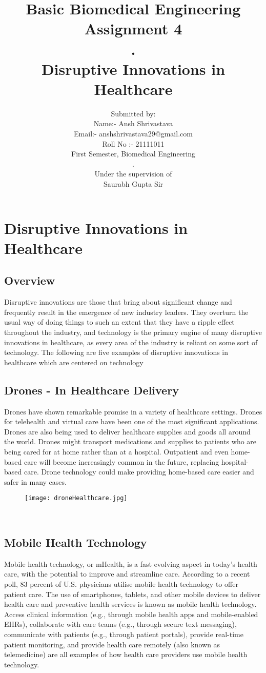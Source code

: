 \documentclass[12pt]{article}
\title{Basic Biomedical Engineering\\Assignment 4\\.\\Disruptive Innovations in Healthcare}
\author{Submitted by: \\Name:- Ansh Shrivastava\\Email:- anshshrivastava29@gmail.com\\Roll No :- 21111011\\First Semester, Biomedical Engineering\\.\\Under the supervision of\\Saurabh Gupta Sir}
\begin{document}
\maketitle
\clearpage
\tableofcontents
\clearpage

\section{Disruptive Innovations in Healthcare}
\subsection{Overview}
Disruptive innovations are those that bring about significant change and frequently result in the emergence of new industry leaders. They overturn the usual way of doing things to such an extent that they have a ripple effect throughout the industry,  and technology is the primary engine of many disruptive innovations in healthcare, as every area of the industry is reliant on some sort of technology. The following are five examples of disruptive innovations in healthcare which are centered on technology
\subsection{Drones - In Healthcare Delivery}
Drones have shown remarkable promise in a variety of healthcare settings. Drones for telehealth and virtual care have been one of the most significant applications. Drones are also being used to deliver healthcare supplies and goods all around the world. Drones might transport medications and supplies to patients who are being cared for at home rather than at a hospital. Outpatient and even home-based care will become increasingly common in the future, replacing hospital-based care. Drone technology could make providing home-based care easier and safer in many cases.
\\
\begin{figure}[h]
\centering
\texttt{[image: droneHealthcare.jpg]}
\label{fig_droneHealthcare}
\end{figure}
\\
\subsection{Mobile Health Technology}
Mobile health technology, or mHealth, is a fast evolving aspect in today's health care, with the potential to improve and streamline care. According to a recent poll, 83 percent of U.S. physicians utilise mobile health technology to offer patient care. The use of smartphones, tablets, and other mobile devices to deliver health care and preventive health services is known as mobile health technology. Access clinical information (e.g., through mobile health apps and mobile-enabled EHRs), collaborate with care teams (e.g., through secure text messaging), communicate with patients (e.g., through patient portals), provide real-time patient monitoring, and provide health care remotely (also known as telemedicine) are all examples of how health care providers use mobile health technology.
\end{document}
